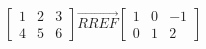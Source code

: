 \documentclass[preview]{standalone}
\begin{document}
\[ 
 \begin{bmatrix}1 & 2 & 3 \\ 4 & 5 & 6\end{bmatrix} 
    \overrightarrow{RREF} 
 \begin{bmatrix}1 & 0 & -1\\ 0 & 1 & 2\end{bmatrix} 
 \] 
\end{document}
